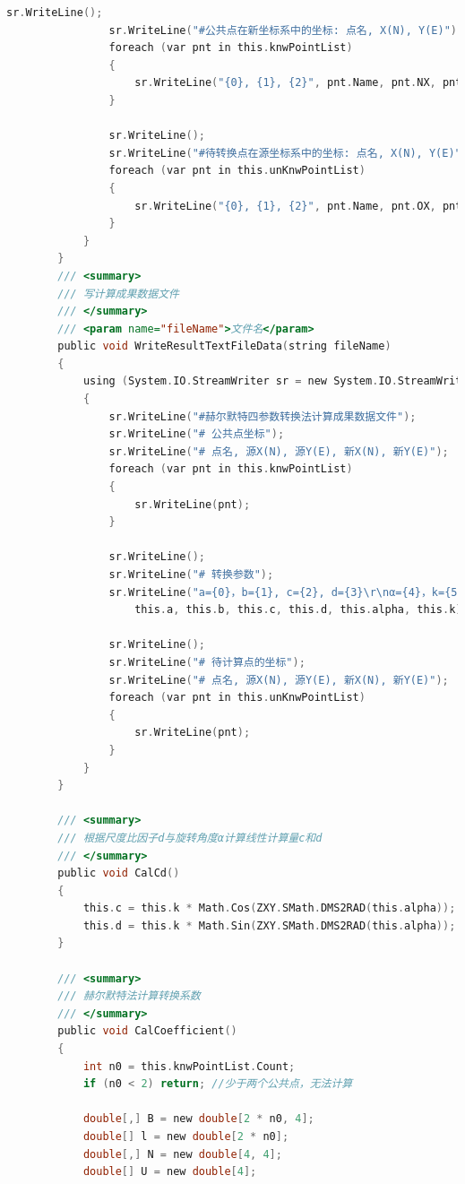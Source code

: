 \begin{lstlisting}[language=C]
                sr.WriteLine();
                sr.WriteLine("#公共点在新坐标系中的坐标: 点名, X(N), Y(E)");
                foreach (var pnt in this.knwPointList)
                {
                    sr.WriteLine("{0}, {1}, {2}", pnt.Name, pnt.NX, pnt.NY);
                }

                sr.WriteLine();
                sr.WriteLine("#待转换点在源坐标系中的坐标: 点名, X(N), Y(E)");
                foreach (var pnt in this.unKnwPointList)
                {
                    sr.WriteLine("{0}, {1}, {2}", pnt.Name, pnt.OX, pnt.OY);
                }
            }
        }
        /// <summary>
        /// 写计算成果数据文件
        /// </summary>
        /// <param name="fileName">文件名</param>
        public void WriteResultTextFileData(string fileName)
        {
            using (System.IO.StreamWriter sr = new System.IO.StreamWriter(fileName))
            {
                sr.WriteLine("#赫尔默特四参数转换法计算成果数据文件");
                sr.WriteLine("# 公共点坐标");
                sr.WriteLine("# 点名, 源X(N), 源Y(E), 新X(N), 新Y(E)");
                foreach (var pnt in this.knwPointList)
                {
                    sr.WriteLine(pnt);
                }

                sr.WriteLine();
                sr.WriteLine("# 转换参数");
                sr.WriteLine("a={0}，b={1}, c={2}, d={3}\r\nα={4}，k={5}", 
                    this.a, this.b, this.c, this.d, this.alpha, this.k);

                sr.WriteLine();
                sr.WriteLine("# 待计算点的坐标");
                sr.WriteLine("# 点名, 源X(N), 源Y(E), 新X(N), 新Y(E)");
                foreach (var pnt in this.unKnwPointList)
                {
                    sr.WriteLine(pnt);
                }
            }
        }

        /// <summary>
        /// 根据尺度比因子d与旋转角度α计算线性计算量c和d
        /// </summary>
        public void CalCd()
        {
            this.c = this.k * Math.Cos(ZXY.SMath.DMS2RAD(this.alpha));
            this.d = this.k * Math.Sin(ZXY.SMath.DMS2RAD(this.alpha));
        }

        /// <summary>
        /// 赫尔默特法计算转换系数
        /// </summary>
        public void CalCoefficient()
        {
            int n0 = this.knwPointList.Count;
            if (n0 < 2) return; //少于两个公共点，无法计算

            double[,] B = new double[2 * n0, 4];
            double[] l = new double[2 * n0];
            double[,] N = new double[4, 4];
            double[] U = new double[4];


\end{lstlisting}
